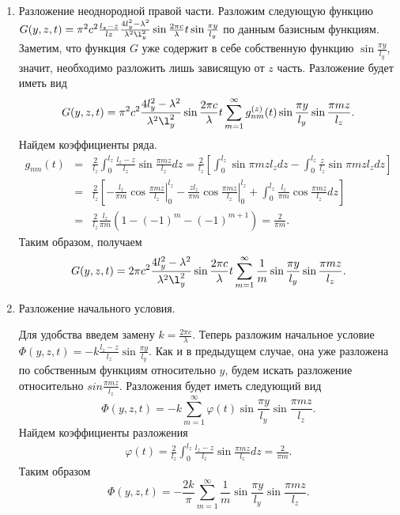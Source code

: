 \begin{enumerate}
\item Разложение неоднородной правой части.
  Разложим следующую функцию $G(y, z, t) = \pi^2 c^2\frac{l_z - z}{lz}\frac{4l_y^2 - \lambda^2}{\lambda^2 \l_y^2}\sin\frac{2\pi c}{\lambda}t \sin\frac{\pi y}{l_y}$ по данным базисным функциям. Заметим, что функция $G$ уже содержит в себе собственную функцию $\sin\frac{\pi y}{l_y}$, значит, необходимо разложить лишь зависящую от $z$ часть. Разложение будет иметь вид
  \[
  G(y, z, t) =  \pi^2 c^2 \frac{4l_y^2 - \lambda^2}{\lambda^2 \l_y^2} \sin\frac{2\pi c}{\lambda}t\displaystyle \sum_{m=1}^{\infty}  g_{nm}^{(z)}(t) \sin\frac{\pi y}{l_y} \sin\frac{\pi m z}{l_z}.
  \]
  Найдем коэффициенты ряда. 
  \begin{eqnarray*}
    g_{nm}(t) &=& \frac{2}{l_z} \displaystyle \int_0^{l_z} \frac{l_z - z}{l_z} \sin\frac{\pi m z}{l_z} dz = \frac{2}{l_z}\left[\int_0^{l_z}\sin{\pi m z}{l_z}dz - \int_0^{l_z}\frac{z}{l_z} \sin{\pi m z}{l_z}dz\right]\\
    &=& \frac{2}{l_z} \left[ \left. -\frac{l_z}{\pi m} \cos\frac{\pi m z}{l_z}\right|_{0}^{l_z} - \left. \frac{z l_z}{\pi m}\cos\frac{\pi m z}{l_z}\right|_{0}^{l_z} + \int_0^{l_z}\frac{l_z}{\pi m}\cos\frac{\pi m z}{l_z}dz\right]\\
    &=& \frac{2}{l_z}\frac{l_z}{\pi m} \left( 1 - (-1)^m - (-1)^{m+1} \right) = \frac{2}{\pi m}.
  \end{eqnarray*}
  Таким образом, получаем
  \[
  G(y, z, t) = 2\pi c^2\frac{4l_y^2 - \lambda^2}{\lambda^2 \l_y^2} \sin\frac{2\pi c}{\lambda}t\displaystyle \sum_{m=1}^{\infty}\frac{1}{m}\sin\frac{\pi y}{l_y} \sin\frac{\pi m z}{l_z}.
  \]

\item Разложение начального условия.


  Для удобства введем замену $k = \frac{2\pi c}{\lambda}$. Теперь разложим начальное условие  $\Phi(y, z, t) = -k\frac{l_z - z}{l_z}\sin\frac{\pi y}{l_y}$. Как и в предыдущем случае, она уже разложена по собственным функциям относительно $y$, будем искать разложение относительно $sin\frac{\pi m z}{l_z}$. Разложения будет иметь следующий вид
  \[
  \Phi(y, z, t) = \displaystyle -k\sum_{m=1}^{\infty}\varphi(t) \sin\frac{\pi y}{l_y} \sin\frac{\pi m z}{l_z}.
  \]
  Найдем коэффициенты разложения
  \begin{eqnarray*}
    \varphi(t) = \displaystyle \frac{2}{l_z} \int_0^{l_z} \frac{l_z - z}{l_z}\sin\frac{\pi m z}{l_z}dz = \frac{2}{\pi m}.
  \end{eqnarray*}
  Таким образом
  \[
  \Phi(y, z, t) = -\frac{2k}{\pi}\displaystyle \sum_{m=1}^{\infty} \frac{1}{m} \sin\frac{\pi y}{l_y} \sin\frac{\pi m z}{l_z}.
  \]
\end{enumerate}

